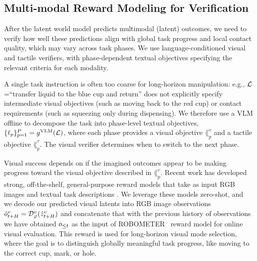 \subsection{Multi-modal Reward Modeling for Verification}
\label{subsec:method_reward_modeling}
After the latent world model predicts multimodal (latent) outcomes, we need to verify how well these predictions align with global task progress and local contact quality, which may vary across task phases. 
We use language-conditioned visual and tactile verifiers, with phase-dependent textual objectives specifying the relevant criteria for each modality.


A single task instruction is often too coarse for long-horizon manipulation: e.g., $\mathcal{L}$=``transfer liquid to the blue cup and return'' does not explicitly specify intermediate visual objectives (such as moving back to the red cup) or contact requirements (such as squeezing only during dispensing). We therefore use a VLM offline to decompose the task into phase-level textual objectives,
    $\{\ell_p\}_{p=1}^{P} = g^{\mathrm{VLM}}(\mathcal{L})$, 
where each phase provides a visual objective $\lang_p^v$ and a tactile objective $\lang_p^\tau$. The visual verifier determines when to switch to the next phase.

Visual success depends on if the imagined outcomes appear to be making progress toward the visual objective described in $\lang_p^v$. 
Recent work has developed strong, off-the-shelf, general-purpose reward models that take as input RGB images and textual task descriptions \cite{tan2025robo, liang2026robometer, ma2025vision}.
We leverage these models zero-shot, and we decode our predicted visual latents into RGB image observations $\hat{o}^v_{t+H} = \mathcal{D}_\varphi^v(\hat{z}^v_{t+H})$ and concatenate that with the previous history of observations we have obtained $o_{\leq t}$ as the input of ROBOMETER~\cite{liang2026robometer} reward model for online visual evaluation. 
This reward is used for long-horizon visual mode selection, where the goal is to distinguish globally meaningful task progress, like moving to the correct cup, mark, or hole.


